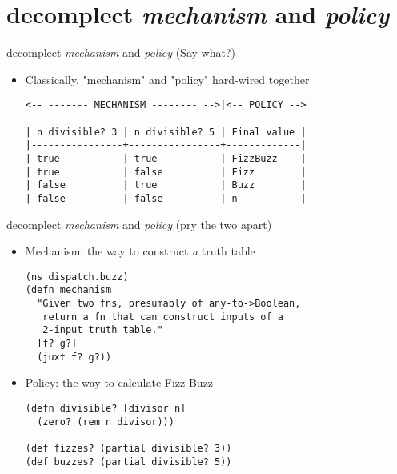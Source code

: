 \documentclass[presentation]{beamer}
\begin{document}
\section{decomplect \emph{mechanism} and \emph{policy}}
\label{sec:org81aebbb}
\begin{frame}[label={sec:org2eda929},fragile]{decomplect \emph{mechanism} and \emph{policy} (Say what?)}
 \begin{itemize}
\item Classically, "mechanism" and "policy" hard-wired together
\begin{verbatim}
<-- ------- MECHANISM -------- -->|<-- POLICY -->

| n divisible? 3 | n divisible? 5 | Final value |
|----------------+----------------+-------------|
| true           | true           | FizzBuzz    |
| true           | false          | Fizz        |
| false          | true           | Buzz        |
| false          | false          | n           |
\end{verbatim}
\end{itemize}
\end{frame}
\begin{frame}[label={sec:org91ec3d5},fragile]{decomplect \emph{mechanism} and \emph{policy} (pry the two apart)}
 \begin{itemize}
\item \alert{Mechanism}: the way to construct \emph{a} truth table
\begin{verbatim}
(ns dispatch.buzz)
(defn mechanism
  "Given two fns, presumably of any-to->Boolean,
   return a fn that can construct inputs of a
   2-input truth table."
  [f? g?]
  (juxt f? g?))
\end{verbatim}
\item \alert{Policy}: the way to calculate Fizz Buzz
\begin{verbatim}
(defn divisible? [divisor n]
  (zero? (rem n divisor)))

(def fizzes? (partial divisible? 3))
(def buzzes? (partial divisible? 5))
\end{verbatim}
\end{itemize}
\end{frame}
\end{document}
